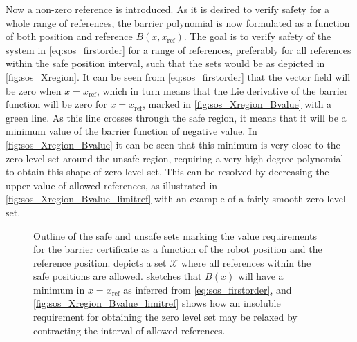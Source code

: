 Now a non-zero reference is introduced. As it is desired to verify safety for a whole range of references, the barrier polynomial is now formulated as a function of both position and reference $B(x,x_\text{ref})$.
The goal is to verify safety of the system in \autoref{eq:sos_firstorder} for a range of references, preferably for all references within the safe position interval, such that the sets would be as depicted in \autoref{fig:sos_Xregion}.
It can be seen from \autoref{eq:sos_firstorder} that the vector field will be zero when $x=x_\text{ref}$, which in turn means that the Lie derivative of the barrier function will be zero for $x=x_\text{ref}$, marked in \autoref{fig:sos_Xregion_Bvalue} with a green line. As this line crosses through the safe region, it means that it will be a minimum value of the barrier function of negative value. In \autoref{fig:sos_Xregion_Bvalue} it can be seen that this minimum is very close to the zero level set around the unsafe region, requiring a very high degree polynomial to obtain this shape of zero level set. This can be resolved by decreasing the upper value of allowed references, as illustrated in \autoref{fig:sos_Xregion_Bvalue_limitref} with an example of a fairly smooth zero level set.

\begin{figure}[htbp]
\centering
{}%
\hspace{3mm}
%
\hspace{3mm}
%
\caption{Outline of the safe and unsafe sets marking the value requirements for the barrier certificate as a function of the robot position and the reference position.  depicts a set $\mathcal{X}$ where all references within the safe positions are allowed.  sketches that $B(x)$ will have a minimum in $x=x_\text{ref}$ as inferred from \autoref{eq:sos_firstorder}, and \autoref{fig:sos_Xregion_Bvalue_limitref} shows how an insoluble requirement for obtaining the zero level set may be relaxed by contracting the interval of allowed references.}
\label{fig:sets_reference}
\end{figure}

